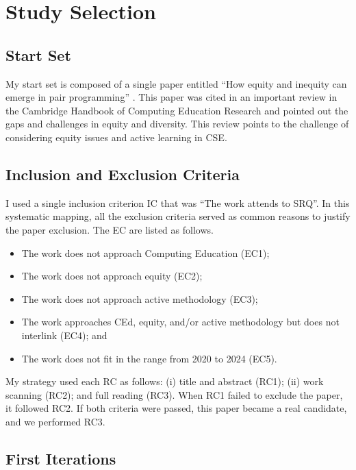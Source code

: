 \section{Study Selection}
\label{rel-work:study-selection}

\subsection{Start Set}
\label{rel-work-ss:start-set}

My start set is composed of a single paper entitled “How equity and inequity can emerge in pair programming” \cite{lewis:2015}. This paper was cited in an important review in the Cambridge Handbook of Computing Education Research \cite{lewis:2019} and pointed out the gaps and challenges in equity and diversity. This review points to the challenge of considering equity issues and active learning in \gls{CSE}.

\subsection{Inclusion and Exclusion Criteria}
\label{rel-work-ss:inc-exc-criteria}

I used a single inclusion criterion \gls{IC} that was “The work attends to \gls{SRQ}”. In this systematic mapping, all the exclusion criteria served as common reasons to justify the paper exclusion. The \gls{EC} are listed as follows.
\begin{itemize}
    \item The work does not approach Computing Education (\gls{EC}1);
    \item The work does not approach equity (\gls{EC}2);
    \item The work does not approach active methodology (\gls{EC}3);
    \item The work approaches \gls{CEd}, equity, and/or active methodology but does not interlink (\gls{EC}4); and
    \item The work does not fit in the range from 2020 to 2024 (\gls{EC}5).
\end{itemize}

My strategy used each \gls{RC} as follows: (i) title and abstract (\gls{RC}1); (ii) work scanning (\gls{RC}2); and full reading (\gls{RC}3). When \gls{RC}1 failed to exclude the paper, it followed \gls{RC}2. If both criteria were passed, this paper became a real candidate, and we performed \gls{RC}3. 

\subsection{First Iterations}
\label{rel-work-ss:first-iterations}

